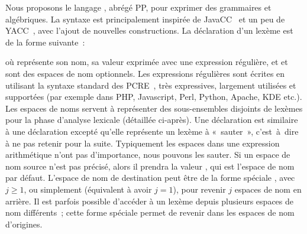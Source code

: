 Nous proposons le langage , abrégé PP, pour exprimer des
grammaires  et algébriques. La syntaxe est principalement
inspirée de JavaCC~ et un peu de YACC~, avec
l'ajout de nouvelles constructions. La déclaration d'un lexème est de la forme
suivante~:
%
\begin{pre}
\end{pre}
%
où  représente son nom,  sa valeur exprimée avec une
expression régulière, et  et  sont des espaces
de nom optionnels. Les expressions régulières sont écrites en utilisant la
syntaxe standard des PCRE~, très expressives, largement utilisées
et supportées (par exemple dans PHP, Javascript, Perl, Python, Apache, KDE
etc.). Les espaces de noms servent à représenter des sous-ensembles disjoints de
lexèmes pour la phase d'analyse lexicale (détaillée ci-après). Une déclaration
 est similaire à une déclaration  excepté qu'elle
représente un lexème à «~sauter~», c'est~à~dire à ne pas retenir pour la suite.
Typiquement les espaces dans une expression arithmétique n'ont pas d'importance,
nous pouvons les sauter. Si un espace de nom source n'est pas précisé, alors il
prendra la valeur , qui est l'espace de nom par défaut. L'espace
de nom de destination peut être de la forme spéciale ,
avec $j \geq 1$, ou simplement  (équivalent à avoir $j =
1$), pour revenir $j$ espaces de nom en arrière. Il est parfois possible
d'accéder à un lexème depuis plusieurs espaces de nom différents~; cette forme
spéciale permet de revenir dans les espaces de nom d'origines. \\

